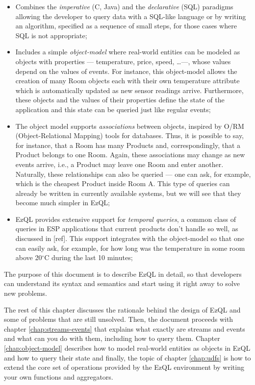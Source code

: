 \documentclass{report}
\begin{document}
\begin{itemize}
\item Combines the \emph{imperative} (C, Java) and the
  \emph{declarative} (SQL) paradigms allowing the developer to query
  data with a SQL-like language or by writing an algorithm, specified
  as a sequence of small steps, for those cases where SQL is not
  appropriate;
\item Includes a simple \emph{object-model} where real-world entities
  can be modeled as objects with properties --- temperature, price,
  speed, \ldots ---, whose values depend on the values of events. For
  instance, this object-model allows the creation of many Room objects
  each with their own temperature attribute which is automatically
  updated as new sensor readings arrive. Furthermore, these objects
  and the values of their properties define the state of the
  application and this state can be queried just like regular events;
\item The object model supports \emph{associations} between objects,
  inspired by O/RM (Object-Relational Mapping) tools for
  databases. Thus, it is possible to say, for instance, that a Room
  has many Products and, correspondingly, that a Product belongs to
  one Room. Again, these associations may change as new events arrive,
  i.e., a Product may leave one Room and enter another. Naturally,
  these relationships can also be queried --- one can ask, for
  example, which is the cheapest Product inside Room A. This type of
  queries can already be written in currently available systems, but
  we will see that they become much simpler in EzQL;
\item EzQL provides extensive support for \emph{temporal queries}, a
  common class of queries in ESP applications that current products
  don't handle so well, as discussed in [ref]. This support integrates
  with the object-model so that one can easily ask, for example, for
  how long was the temperature in some room above 20$^{\circ}$C during
  the last 10 minutes;
\end{itemize}

The purpose of this document is to describe EzQL in detail, so that
developers can understand its syntax and semantics and start using it
right away to solve new problems.

The rest of this chapter discusses the rationale behind the design of
EzQL and some of problems that are still unsolved. Then, the document
proceeds with chapter \ref{chap:streams-events} that explains what
exactly are streams and events and what can you do with them,
including how to query them. Chapter \ref{chap:object-model} describes
how to model real-world entities as objects in EzQL and how to query
their state and finally, the topic of chapter \ref{chap:udfs} is how
to extend the core set of operations provided by the EzQL environment
by writing your own functions and aggregators.
\end{document}
